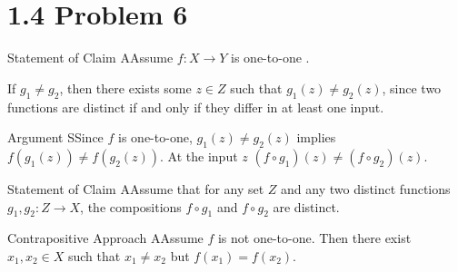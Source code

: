 \documentclass{report}
\begin{document}

\section*{1.4 Problem 6}


\begin{ClaimWithMagnolia}{Statement of Claim}
    AAssume $f: X \to Y$ is one-to-one .
\end{ClaimWithMagnolia}

\begin{keyideaWithLotus}
    If $g_1 \neq g_2$, then there exists some $z \in Z$ such that $g_1(z) \neq g_2(z)$, since two functions are distinct if and only if they differ in at least one input.
\end{keyideaWithLotus}

\begin{RemarkWithLily}{Argument}
    SSince $f$ is one-to-one, $g_1(z) \neq g_2(z)$ implies $f(g_1(z)) \neq f(g_2(z))$. At the input $z$ $(f \circ g_1)(z) \neq (f \circ g_2)(z)$. 
\end{RemarkWithLily}

\begin{ClaimWithMagnolia}{Statement of Claim}
    AAssume that for any set $Z$ and any two distinct functions $g_1, g_2: Z \to X$, the compositions $f \circ g_1$ and $f \circ g_2$ are distinct. 
\end{ClaimWithMagnolia}

\begin{ContrapositiveWithLycoris}{Contrapositive Approach}
    AAssume $f$ is not one-to-one. Then there exist $x_1, x_2 \in X$ such that $x_1 \neq x_2$ but $f(x_1) = f(x_2)$. 
\end{ContrapositiveWithLycoris}
    
\end{document}
